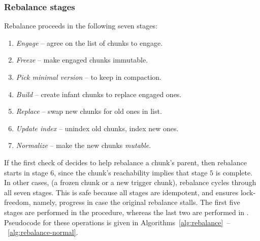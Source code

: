 \subsubsection{Rebalance stages}
\label{sec:rebalance-stages}

\remove{
\newenvironment{compactenum}
{ \begin{enumerate}
    \setlength{\itemsep}{0pt}
    \setlength{\parskip}{0pt}
    \setlength{\parsep}{2pt}     }
{ \end{enumerate}      }
}

Rebalance  proceeds in the following seven stages:
\begin{enumerate}
\item \emph{Engage} -- agree on the list of chunks to engage.
\item \emph{Freeze}  -- make engaged chunks immutable.
\item \emph{Pick minimal version} --  to keep in compaction.
\item \emph{Build} -- create infant chunks to replace engaged ones.
\item \emph{Replace} -- swap new chunks for old ones in  list.
\item \emph{Update index} -- unindex old chunks,  index new ones.
\item \emph{Normalize} -- make the new chunks \emph{mutable}.
\end{enumerate}

If the first check of  decides to help rebalance a chunk's parent, then
rebalance starts in stage $6$, since the chunk's reachability implies that stage $5$ is complete.
In other cases, (a frozen chunk or a new trigger chunk), rebalance cycles through all seven stages.
This is safe because all stages are idempotent, and ensures lock-freedom, namely, progress in case the original rebalance stalls.
The first five stages are performed in the  procedure, whereas the last two are performed in .
Pseudocode for these operations is given in Algorithms~\ref{alg:rebalance}~--~\ref{alg:rebalance-normal}.




